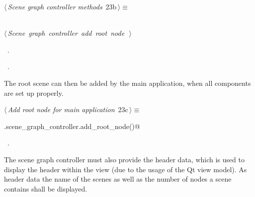 \documentclass[
    a4paper,      %
    10pt,         %
    openright,    %
    notitlepage,  %
    parskip=half, %
]{scrreprt}       %
\theoremstyle{definition}                    %
\begin{document}
\begin{flushleft} \small
\begin{minipage}{\linewidth}\label{scrap19}\raggedright\small
{} $\langle\,${\itshape Scene graph controller methods}\nobreak\ {\footnotesize {23b}}$\,\rangle\equiv$
\vspace{-1ex}
\begin{list}{}{} \item
\mbox{}\lstinline@@\\
\mbox{}\lstinline@@\hbox{$\langle\,${\itshape Scene graph controller add root node}\nobreak\ {\footnotesize {}}$\,\rangle$}\lstinline@@\\
\mbox{}\lstinline@@{\NWsep}
\end{list}
\vspace{-1.5ex}
\footnotesize
\begin{list}{}{\setlength{\itemsep}{-\parsep}\setlength{\itemindent}{-\leftmargin}}
\item \NWtxtMacroDefBy\ .
\item \NWtxtMacroRefIn\ .

\item{}
\end{list}
\end{minipage}\vspace{4ex}
\end{flushleft}
The root scene can then be added by the main application, when all components
are set up properly.

\begin{flushleft} \small
\begin{minipage}{\linewidth}\label{scrap20}\raggedright\small
{} $\langle\,${\itshape Add root node for main application}\nobreak\ {\footnotesize {23c}}$\,\rangle\equiv$
\vspace{-1ex}
\begin{list}{}{} \item
\mbox{}\lstinline@self.scene_graph_controller.add_root_node()@{\NWsep}
\end{list}
\vspace{-1.5ex}
\footnotesize
\begin{list}{}{\setlength{\itemsep}{-\parsep}\setlength{\itemindent}{-\leftmargin}}
\item \NWtxtMacroRefIn\ .

\item{}
\end{list}
\end{minipage}\vspace{4ex}
\end{flushleft}
The scene graph controller must also provide the header data, which is used to
display the header within the view (due to the usage of the Qt view
model). As header data the name of the
scenes as well as the number of nodes a scene contains shall be displayed.
\end{document}
